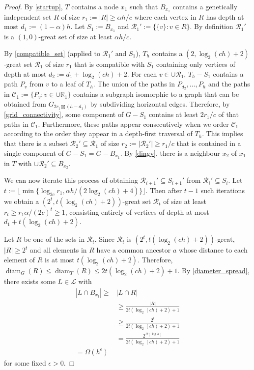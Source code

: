 \documentclass{patmorin}
\DeclareMathOperator{\diam}{diam}
\begin{document}
\begin{proof}
  By \cref{startup}, $T$ contains a node $x_1$ such that $B_{x_1}$ contains a genetically independent set $R$ of size $r_1:=|R|\ge \alpha h/c$ where each vertex in $R$ has depth at most $d_1:=(1-\alpha)h$.  Let $S_1:=B_{x_1}$ and $\mathcal{R}_1':=\{\{v\}:v\in R\}$.  By definition $\mathcal{R}_1'$ is a $(1,0)$-great set of size at least $\alpha h/c$.

  By \cref{compatible_set} (applied to $\mathcal{R}_1'$ and $S_1$), $T_h$ contains a $(2,\log_2(ch)+2)$-great set $\mathcal{R}_1$ of size $r_1$ that is compatible with $S_1$ containing only vertices of depth at most $d_2:=d_1+\log_2(ch)+2$.  For each $v\in\cup\mathcal{R}_1$, $T_h-S_1$ contains a path $P_v$ from $v$ to a leaf of $T_h$.  The union of the paths in $P_{d_2},\ldots,P_{h}$ and the paths in $\mathcal{C}_1:=\{P_v:v\in\cup\mathbb{R}_1\}$ contains a subgraph isomorphic to a graph that can be obtained from $G_{2r_1\boxtimes (h-d_1)}$ by subdividing horizontal edges.  Therefore, by \cref{grid_connectivity}, some component of $G-S_1$ contains at least $2r_1/c$ of that paths in $\mathcal{C}_1$.  Furthermore, these paths appear consecutively when we order $\mathcal{C}_1$ according to the order they appear in a depth-first traversal of $T_h$.  This implies that there is a subset $\mathcal{R}_2'\subseteq \mathcal{R}_1$ of size $r_2:=|\mathcal{R}_2'|\ge r_1/c$ that is contained in a single component of $G-S_1=G-B_{x_1}$. By \cref{dingy}, there is a neighbour $x_2$ of $x_1$ in $T$ with $\cup\mathcal{R}_2'\subseteq B_{x_2}$.

  We can now iterate this process of obtaining $\mathcal{R}_{i+1}'\subseteq S_{i+1}'$ from $\mathcal{R}_i'\subseteq S_i$. Let $t:= \lfloor \min\{\log_{2c} r_1,\alpha h/(2\log_2(ch)+4)\}\rfloor$. Then after $t-1$ such iterations we obtain a $(2^t,t(\log_2(ch)+2))$-great set $\mathcal{R}_t$ of size at least $r_t \ge r_1\alpha/(2c)^t \ge 1$, consisting entirely of vertices of depth at most $d_1+t(\log_2(ch)+2)$.

  Let $R$ be one of the sets in $\mathcal{R}_t$.  Since $\mathcal{R}_t$ is $(2^t,t(\log_2(ch)+2))$-great, $|R|\ge 2^t$ and all elements in $R$ have a common ancestor $a$ whose distance to each element of $R$ is at most $t(\log_2(ch)+2)$.  Therefore, $\diam_G(R)\le\diam_T(R)\le 2t(\log_2(ch)+2)+1$. By \cref{diameter_spread}, there exists some $L\in\mathcal{L}$ with
  \begin{align*}
    |L\cap B_{x_t}|\ge 
    & |L\cap R| \\
    & \ge \frac{|R|}{2t(\log_2(ch)+2)+1} \\ 
    & \ge \frac{2^t}{2t(\log_2(ch)+2)+1} \\
    & = \frac{2^{\Omega(\log h)}}{2t(\log_2(ch)+2)+1} \\
    = \Omega(h^\epsilon) 
  \end{align*}
  for some fixed $\epsilon >0$.
\end{proof}
\end{document}
